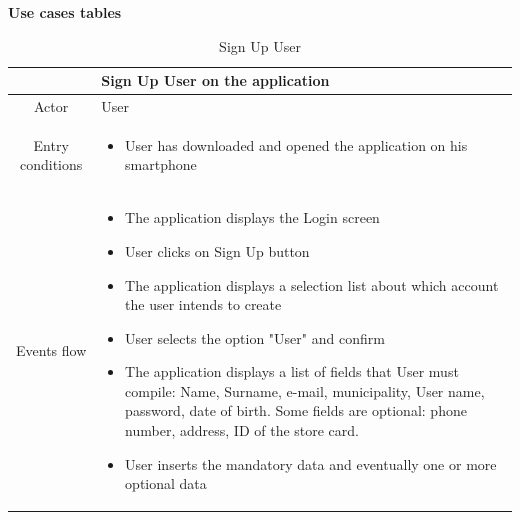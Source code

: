 \documentclass[table, 12pt]{article}
\begin{document}
\newpage
\textbf{Use cases tables}\\

\begin{longtable}{ | c | p{10cm} | }
    \caption{Sign Up User}                                                                                                                                                                                                                                                                    \\

    \hline
                     & Sign Up User on the application                                                                                                                                                                                                                                        \\
    \hline
    Actor            & User                                                                                                                                                                                                                                                                   \\
    \hline
    Entry conditions &
    \begin{itemize}
        \item User has downloaded and opened the application on his smartphone
    \end{itemize}                                                                                                                                                                                                                                                                \\
    \hline
    Events flow      & \begin{itemize}
        \item The application displays the Login screen
        \item User clicks on Sign Up button
        \item The application displays a selection list about which account the user intends to create
        \item User selects the option "User" and confirm
        \item The application displays a list of fields that User must compile: Name, Surname, e-mail, municipality, User name, password, date of birth. Some fields are optional: phone number, address, ID of the store card.
        \item User inserts the mandatory data and eventually one or more optional data

\end{itemize}
\end{longtable}
\end{document}
